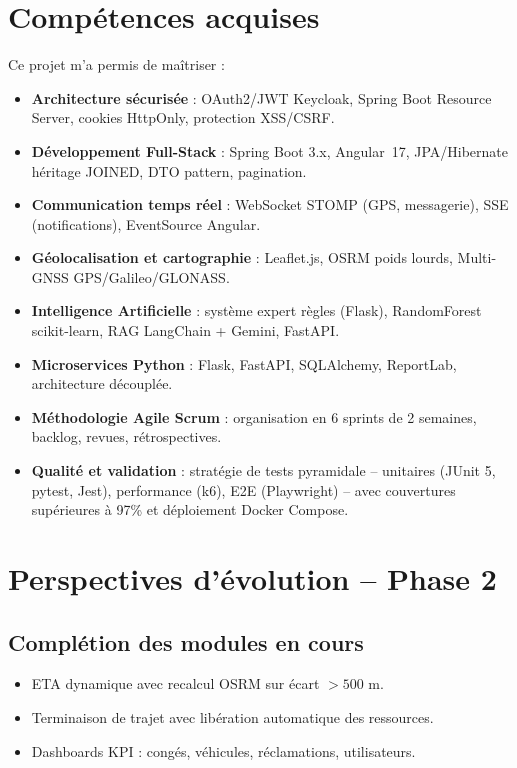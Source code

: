 \documentclass[12pt,a4paper]{report}
\begin{document}
\section{Compétences acquises}
\label{sec:ch11-competences}

Ce projet m'a permis de maîtriser :

\begin{itemize}
  \item \textbf{Architecture sécurisée} : OAuth2/JWT Keycloak, Spring Boot
        Resource Server, cookies HttpOnly, protection XSS/CSRF.
  \item \textbf{Développement Full-Stack} : Spring Boot 3.x, Angular~17,
        JPA/Hibernate héritage JOINED, DTO pattern, pagination.
  \item \textbf{Communication temps réel} : WebSocket STOMP (GPS, messagerie),
        SSE (notifications), EventSource Angular.
  \item \textbf{Géolocalisation et cartographie} : Leaflet.js, OSRM poids lourds,
        Multi-GNSS GPS/Galileo/GLONASS.
  \item \textbf{Intelligence Artificielle} : système expert règles (Flask),
        RandomForest scikit-learn, RAG LangChain + Gemini, FastAPI.
  \item \textbf{Microservices Python} : Flask, FastAPI, SQLAlchemy,
        ReportLab, architecture découplée.
  \item \textbf{Méthodologie Agile Scrum} : organisation en 6 sprints de
        2 semaines, backlog, revues, rétrospectives.
  \item \textbf{Qualité et validation} : stratégie de tests pyramidale --
        unitaires (JUnit 5, pytest, Jest), performance (k6), E2E (Playwright)
        -- avec couvertures supérieures à 97\% et déploiement Docker Compose.
\end{itemize}

\section{Perspectives d'évolution -- Phase 2}
\label{sec:ch11-perspectives}

\subsection{Complétion des modules en cours}

\begin{itemize}
  \item ETA dynamique avec recalcul OSRM sur écart $>500$ m.
  \item Terminaison de trajet avec libération automatique des ressources.
  \item Dashboards KPI : congés, véhicules, réclamations, utilisateurs.
\end{itemize}
\end{document}
